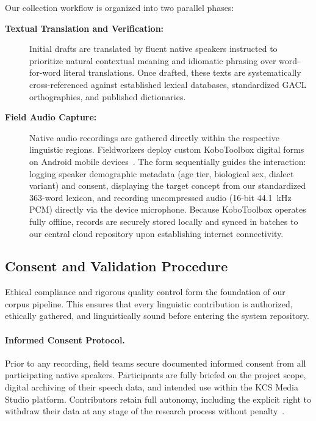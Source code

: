 \documentclass[a4paper,11pt]{article}
\begin{document}
Our collection workflow is organized into two parallel phases:
\begin{description}
    \item[\textbf{Textual Translation and Verification:}] Initial drafts are translated by fluent native speakers instructed to prioritize natural contextual meaning and idiomatic phrasing over word-for-word literal translations. Once drafted, these texts are systematically cross-referenced against established lexical databases, standardized GACL orthographies, and published dictionaries.
    \item[\textbf{Field Audio Capture:}] Native audio recordings are gathered directly within the respective linguistic regions. Fieldworkers deploy custom KoboToolbox digital forms on Android mobile devices~\cite{kobotoolbox2024}. The form sequentially guides the interaction: logging speaker demographic metadata (age tier, biological sex, dialect variant) and consent, displaying the target concept from our standardized 363-word lexicon, and recording uncompressed audio (16-bit 44.1~kHz PCM) directly via the device microphone. Because KoboToolbox operates fully offline, records are securely stored locally and synced in batches to our central cloud repository upon establishing internet connectivity.
\end{description}

\subsection{Consent and Validation Procedure}
\label{sec:consent}

Ethical compliance and rigorous quality control form the foundation of our corpus pipeline. This ensures that every linguistic contribution is authorized, ethically gathered, and linguistically sound before entering the system repository.

\paragraph{Informed Consent Protocol.}
Prior to any recording, field teams secure documented informed consent from all participating native speakers. Participants are fully briefed on the project scope, digital archiving of their speech data, and intended use within the KCS Media Studio platform. Contributors retain full autonomy, including the explicit right to withdraw their data at any stage of the research process without penalty~\cite{grenoble2010language}.
\end{document}

